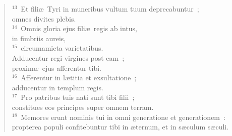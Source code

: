 \begin{flushleft}
\begin{verse}
${}^{13}$~Et fili\ae\ Tyri in muneribus vultum tuum deprecabuntur~;\\ omnes divites plebis.\\
${}^{14}$~Omnis gloria ejus fili\ae\ regis ab intus,\\ in fimbriis aureis,\\
${}^{15}$~circumamicta varietatibus.\\ Adducentur regi virgines post eam~;\\ proxim\ae\ ejus afferentur tibi.\\
${}^{16}$~Afferentur in l\ae titia et exsultatione~;\\ adducentur in templum regis.\\
${}^{17}$~Pro patribus tuis nati sunt tibi filii~;\\ constitues eos principes super omnem terram.\\
${}^{18}$~Memores erunt nominis tui in omni generatione et generationem~:\\ propterea populi confitebuntur tibi in \ae ternum, et in s\ae culum s\ae culi.\end{verse}\end{flushleft}


